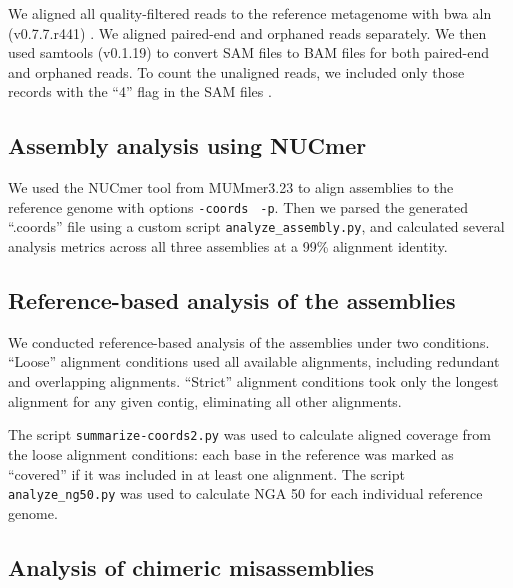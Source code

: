 \documentclass[11pt]{article}
\begin{document}
We aligned all quality-filtered reads to the reference metagenome with
bwa aln (v0.7.7.r441) \cite{bwa}. We aligned paired-end and orphaned
reads separately. We then used samtools (v0.1.19)
\cite{sam-stools} to convert SAM files to BAM files for both
paired-end and orphaned reads. To count the unaligned reads, we
included only those records with the ``4'' flag in the SAM files
\cite{sam-stools}.
 
\subsection*{Assembly analysis using NUCmer}

We used the NUCmer tool from MUMmer3.23 \cite{mummer3.0} to align
assemblies to the reference genome with options {\tt \--coords} {\tt
  -p}. Then we parsed the generated ``.coords'' file using a custom
script {\tt{analyze\_assembly.py}}, and calculated several analysis
metrics across all three assemblies at a 99\% alignment identity.


\subsection*{Reference-based analysis of the assemblies}

We conducted reference-based analysis of the assemblies under two
conditions.  ``Loose'' alignment conditions used all available
alignments, including redundant and overlapping alignments. ``Strict''
alignment conditions took only the longest alignment for any given
contig, eliminating all other alignments.


The script {\tt summarize-coords2.py} was used to calculate aligned
coverage from the loose alignment conditions: each base in the reference
was marked as ``covered'' if it was included in at least one alignment.
The script {\tt analyze\_ng50.py} was used to calculate NGA 50 for
each individual reference genome.


\subsection*{Analysis of chimeric misassemblies}
\end{document}
